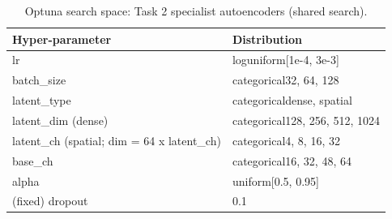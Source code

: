 \begin{table}[t]
\centering
\caption{Optuna search space: Task 2 specialist autoencoders (shared search).}
\label{tab:optuna_ae_specialist_space}
\footnotesize
\begin{tabular}{ll}
\toprule
Hyper-parameter & Distribution \\
\midrule
lr & loguniform[1e-4, 3e-3] \\
batch\_size & categorical{32, 64, 128} \\
latent\_type & categorical{dense, spatial} \\
latent\_dim (dense) & categorical{128, 256, 512, 1024} \\
latent\_ch (spatial; dim = 64 x latent\_ch) & categorical{4, 8, 16, 32} \\
base\_ch & categorical{16, 32, 48, 64} \\
alpha & uniform[0.5, 0.95] \\
(fixed) dropout & 0.1 \\
\bottomrule
\end{tabular}
\end{table}
